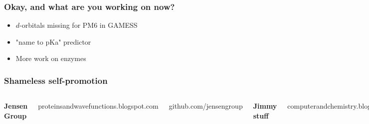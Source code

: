\begin{frame}[fragile]

    \frametitle{Okay, and what are you working on now?}

    \begin{itemize}
        \item $d$-orbitals missing for PM6 in GAMESS
    \end{itemize}

    \bigskip

    \begin{itemize}
        \item "name to pKa" predictor
    \end{itemize}

    \bigskip

    \begin{itemize}
        \item More work on enzymes
    \end{itemize}

\end{frame}


\begin{frame}[fragile]
    \frametitle{Shameless self-promotion}


    \begin{columns}[t]
        
        \footnotesize

        {\bf Jensen Group}

        proteinsandwavefunctions.blogspot.com

        github.com/jensengroup

        \bigskip

        {\bf Jimmy stuff}

        computerandchemistry.blogspot.com

        github.com/charnley
        
        {\scriptsize (Please use my code)}


        \centering
        \includegraphics[width=0.9\linewidth]{images/ku.jpg}

    \end{columns}

\end{frame}

